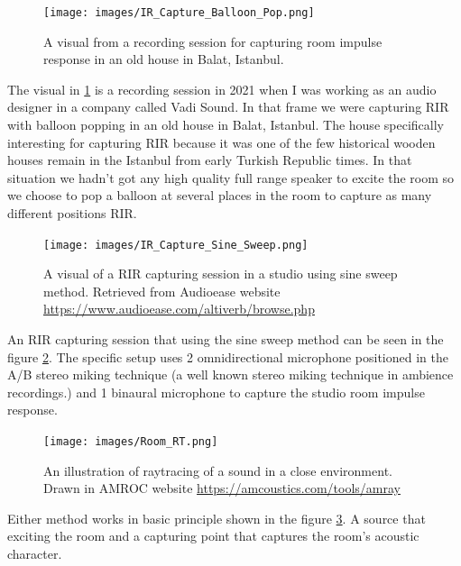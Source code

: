             \begin{figure}[H]
                \centering
                \texttt{[image: images/IR\_Capture\_Balloon\_Pop.png]}
                \caption{A visual from a recording session for capturing room impulse response in an old house in Balat, Istanbul.}
                \label{fig:IR_BALLOON}
            \end{figure}            

            The visual in \ref{fig:IR_BALLOON} is a recording session in 2021 when I was working as an audio designer in a company called Vadi Sound. In that frame we were capturing RIR with balloon popping in an old house in Balat, Istanbul. The house specifically interesting for capturing RIR because it was one of the few historical wooden houses remain in the Istanbul from early Turkish Republic times. In that situation we hadn't got any high quality full range speaker to excite the room so we choose to pop a balloon at several places in the room to capture as many different positions RIR.\par

            \begin{figure}[H]
                \centering
                \texttt{[image: images/IR\_Capture\_Sine\_Sweep.png]}
                \caption{A visual of a RIR capturing session in a studio using sine sweep method. Retrieved from Audioease website \url{https://www.audioease.com/altiverb/browse.php}}
                \label{fig:IR_SINE}
            \end{figure}

            An RIR capturing session that using the sine sweep method can be seen in the figure \ref{fig:IR_SINE}. The specific setup uses 2 omnidirectional microphone positioned in the A/B stereo miking technique (a well known stereo miking technique in ambience recordings.)\cite{Sound_Reinforcement}\cite{Professional_Microphone_Techniques} and 1 binaural microphone to capture the studio room impulse response.\par

            \begin{figure}[H]
                \centering
                \texttt{[image: images/Room\_RT.png]}
                \caption{An illustration of raytracing of a sound in a close environment. Drawn in AMROC website \url{https://amcoustics.com/tools/amray}}
                \label{fig:IR_RAYTRACE}
            \end{figure}

            Either method works in basic principle shown in the figure \ref{fig:IR_RAYTRACE}. A source that exciting the room and a capturing point that captures the room's acoustic character.\par

